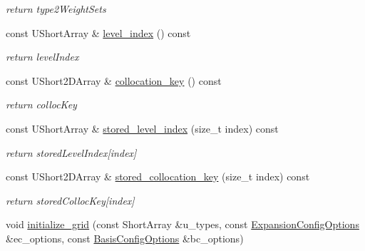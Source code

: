 \begin{DoxyCompactItemize}
\begin{DoxyCompactList}\small\item\em return type2\+Weight\+Sets \end{DoxyCompactList}\item 
const U\+Short\+Array \& \hyperlink{classPecos_1_1TensorProductDriver_a85d74106feabec607654f65787a76b73}{level\+\_\+index} () const \label{classPecos_1_1TensorProductDriver_a85d74106feabec607654f65787a76b73}

\begin{DoxyCompactList}\small\item\em return level\+Index \end{DoxyCompactList}\item 
const U\+Short2\+D\+Array \& \hyperlink{classPecos_1_1TensorProductDriver_a70607db76c306aa1d2e25665c5ba00ed}{collocation\+\_\+key} () const \label{classPecos_1_1TensorProductDriver_a70607db76c306aa1d2e25665c5ba00ed}

\begin{DoxyCompactList}\small\item\em return colloc\+Key \end{DoxyCompactList}\item 
const U\+Short\+Array \& \hyperlink{classPecos_1_1TensorProductDriver_ae3c8fc9bdb6a8d836181e1b9cad033d6}{stored\+\_\+level\+\_\+index} (size\+\_\+t index) const \label{classPecos_1_1TensorProductDriver_ae3c8fc9bdb6a8d836181e1b9cad033d6}

\begin{DoxyCompactList}\small\item\em return stored\+Level\+Index\mbox{[}index\mbox{]} \end{DoxyCompactList}\item 
const U\+Short2\+D\+Array \& \hyperlink{classPecos_1_1TensorProductDriver_a0a5aa65cafc96274d619fa0be4d111b4}{stored\+\_\+collocation\+\_\+key} (size\+\_\+t index) const \label{classPecos_1_1TensorProductDriver_a0a5aa65cafc96274d619fa0be4d111b4}

\begin{DoxyCompactList}\small\item\em return stored\+Colloc\+Key\mbox{[}index\mbox{]} \end{DoxyCompactList}\item 
void \hyperlink{classPecos_1_1TensorProductDriver_a859f844ea03119f1e58183b8bb29f09b}{initialize\+\_\+grid} (const Short\+Array \&u\+\_\+types, const \hyperlink{classPecos_1_1ExpansionConfigOptions}{Expansion\+Config\+Options} \&ec\+\_\+options, const \hyperlink{classPecos_1_1BasisConfigOptions}{Basis\+Config\+Options} \&bc\+\_\+options)\label{classPecos_1_1TensorProductDriver_a859f844ea03119f1e58183b8bb29f09b}


\end{DoxyCompactItemize}
